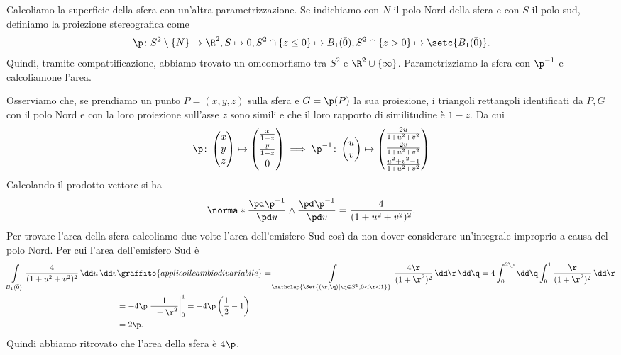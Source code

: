 \begin{ese}
	Calcoliamo la superficie della sfera con un'altra parametrizzazione.
	Se indichiamo con \(N\) il polo Nord della sfera e con \(S\) il polo sud, definiamo la proiezione stereografica come
	\[
		\p \colon S^2 \setminus\{N\} \to \R^2, S \mapsto 0, S^2\cap\{z\le 0\} \mapsto B_1(\bar{0}), S^2 \cap \{z>0\} \mapsto \setc{B_1(\bar{0})}.
	\]
	Quindi, tramite compattificazione, abbiamo trovato un omeomorfismo tra \(S^2\) e \(\R^2\cup \{\infty\}\).
	Parametrizziamo la sfera con \(\p^{-1}\) e calcoliamone l'area.

	Osserviamo che, se prendiamo un punto \(P=(x,y,z)\) sulla sfera e \(G=\p(P)\) la sua proiezione, i triangoli rettangoli identificati da \(P,G\) con il polo Nord e con la loro proiezione sull'asse \(z\) sono simili e che il loro rapporto di similitudine è \(1-z\).
	Da cui
	\[
		\p \colon \begin{pmatrix}x\\y\\z\end{pmatrix} \mapsto \begin{pmatrix}\frac{x}{1-z}\\[0.3em]\frac{y}{1-z}\\[0.3em]0\end{pmatrix} \implies \p^{-1} \colon \begin{pmatrix}u\\v\end{pmatrix} \mapsto \begin{pmatrix}\frac{2u}{1+u^2+v^2}\\[0.3em]\frac{2v}{1+u^2+v^2}\\[0.3em]\frac{u^2+v^2-1}{1+u^2+v^2}\end{pmatrix}
	\]
	Calcolando il prodotto vettore si ha
	\[
		\norma*{\frac{\pd\p^{-1}}{\pd u} \wedge \frac{\pd\p^{-1}}{\pd v}} = \frac{4}{(1+u^2+v^2)^2}.
	\]
	Per trovare l'area della sfera calcoliamo due volte l'area dell'emisfero Sud così da non dover considerare un'integrale improprio a causa del polo Nord.
	Per cui l'area dell'emisfero Sud è
	\[
		\begin{split}
			\int\limits_{B_1(\bar{0})} \frac{4}{(1+u^2+v^2)^2}\,\dd u\,\dd v &\graffito{applico il cambio di variabile} = \int\limits_{\mathclap{\Set{(\r,\q) | \q\in S^1, 0<\r<1}}} \frac{4\r}{(1+\r^2)^2}\,\dd \r\,\dd \q = 4\int_0^{2\p}\dd \q \int_0^1 \frac{\r}{(1+\r^2)^2}\,\dd \r\\
			& = -4\p \left.\frac{1}{1+\r^2}\right|_0^1 = -4\p \left( \frac{1}{2}-1 \right)\\
			& = 2\p.
		\end{split}
	\]
	Quindi abbiamo ritrovato che l'area della sfera è \(4\p\).
\end{ese}

